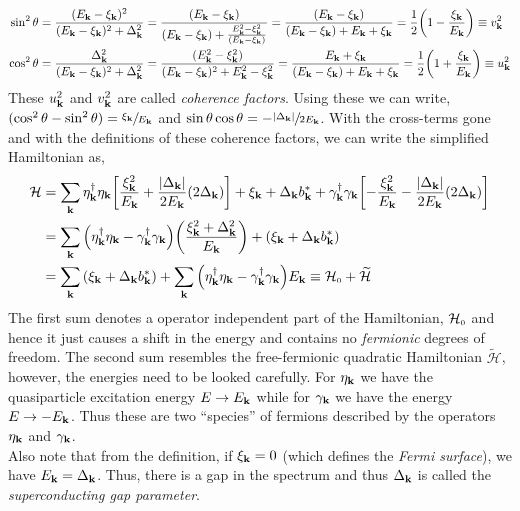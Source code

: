 \documentclass{article}
\newcommand{\tund}[1]{_{\text{\tiny #1}}}
\newcommand{\SH}{\mathcal{H}}
\newcommand{\vk}{\vb{k}}
\newcommand{\ek}{\eta_{\vk}}
\newcommand{\gk}{\gamma_{\vk}}
\begin{document}
\begin{align}
    \sin^2\theta &= \frac{(E_{\vk}-\xi_{\vk})^2}{(E_{\vk}-\xi_{\vk})^2+\Delta_{\vk}^2} =\frac{(E_{\vk}-\xi_{\vk})}{(E_{\vk}-\xi_{\vk})+\frac{E_{\vk}^2-\xi_{\vk}^2}{(E_{\vk}-\xi_{\vk})}} = \frac{(E_{\vk}-\xi_{\vk})}{(E_{\vk}-\xi_{\vk})+E_{\vk}+\xi_{\vk}} =  \frac{1}{2}\qty(1 - \frac{\xi_{\vk}}{E_{\vk}})\equiv v_{\vk}^2\\
    \cos^2\theta &= \frac{\Delta_{\vk}^2}{(E_{\vk}-\xi_{\vk})^2+\Delta_{\vk}^2} =\frac{(E_{\vk}^2-\xi_{\vk}^2)}{(E_{\vk}-\xi_{\vk})^2+E_{\vk}^2-\xi_{\vk}^2} = \frac{E_{\vk}+\xi_{\vk}}{(E_{\vk}-\xi_{\vk}) +E_{\vk}+\xi_{\vk}} = \frac{1}{2}\qty(1 + \frac{\xi_{\vk}}{E_{\vk}})\equiv u_{\vk}^2
\end{align}
These $u_{\vk}^2$ and $v_{\vk}^2$ are called \textit{coherence factors}. Using these we can write, $(\cos^2\theta-\sin^2\theta) = \sfrac{\xi_{\vk}}{E_{\vk}}$ and $\sin\theta\cos\theta = -\sfrac{\abs{\Delta_{\vk}}}{2E_{\vk}}$. With the cross-terms gone and with the definitions of these coherence factors, we can write the simplified Hamiltonian as,
\begin{align}
     \begin{split}
      \SH &=\sum\limits_{\vk} {\ek^\dagger \ek \qty[\frac{\xi_{\vk}^2}{E_{\vk}} + \frac{\abs{\Delta_{\vk}}}{2E_{\vk}}(2 \Delta_{\vk})]} +{\xi_{\vk} + \Delta_{\vk}b_{\vk}^*}+{\gk^\dagger\gk \qty[-\frac{\xi_{\vk}^2}{E_{\vk}}  - \frac{\abs{\Delta_{\vk}}}{2E_{\vk}}(2\Delta_{\vk})]}\\
      &=\sum\limits_{\vk}\qty(\ek^\dagger \ek - \gk^\dagger \gk)\qty(\frac{\xi_{\vk}^2+ \Delta_{\vk}^2}{E_{\vk}}) + \qty({\xi_{\vk} + \Delta_{\vk}b_{\vk}^*})\\
      &=\sum\limits_{\vk}\qty({\xi_{\vk} + \Delta_{\vk}b_{\vk}^*}) + \sum\limits_{\vk} \qty(\ek^\dagger \ek - \gk^\dagger \gk)E_{\vk} \equiv \SH\tund{0} +\widetilde{\SH}
    \end{split}
\end{align}
The first sum denotes a operator independent part of the Hamiltonian, $\SH\tund{0}$ and hence it just causes a shift in the energy and contains no \textit{fermionic} degrees of freedom. The second sum resembles the free-fermionic quadratic Hamiltonian $\widetilde{\SH}$, however, the energies need to be looked carefully. For $\ek$ we have the quasiparticle excitation energy $E\to E_{\vk}$ while for $\gk$ we have the energy $E\to -E_{\vk}$. Thus these are two ``species'' of fermions described by the operators $\ek$ and $\gk$.\\[0.2cm]
Also note that from the definition, if $\xi_{\vk} =0$ (which defines the \textit{Fermi surface}), we have $E_{\vk} = \Delta_{\vk}$. Thus, there is a gap in the spectrum and thus $\Delta_{\vk}$ is called the \textit{superconducting gap parameter}. \\[0.3cm]
\end{document}
